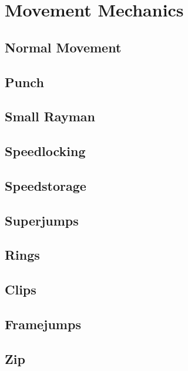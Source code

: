 \chapter{Movement Mechanics}
\label{cha:movement}

\section{Normal Movement}
\label{sec:norm-move}


\section{Punch}
\label{sec:punch}


\section{Small Rayman}
\label{sec:small-rayman}


\section{Speedlocking}
\label{sec:speedlocking}


\section{Speedstorage}
\label{sec:speedstorage}


\section{Superjumps}
\label{sec:superjump}


\section{Rings}
\label{sec:rings}


\section{Clips}
\label{sec:clips}


\section{Framejumps}
\label{sec:framejumps}


\section{Zip}
\label{sec:zip}

